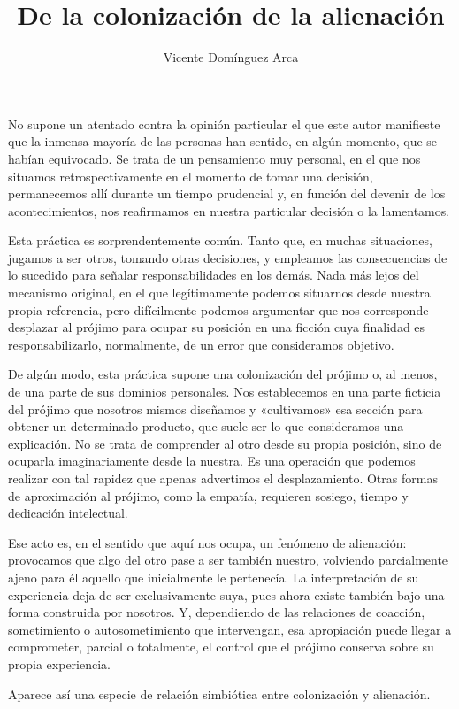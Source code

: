 \documentclass[12pt,a4paper]{article}
\title{\textbf{De la colonización de la alienación}}
\author{Vicente Domínguez Arca}
\date{}
\begin{document}
\maketitle

No supone un atentado contra la opinión particular el que este autor manifieste que la inmensa mayoría de las personas han sentido, en algún momento, que se habían equivocado. Se trata de un pensamiento muy personal, en el que nos situamos retrospectivamente en el momento de tomar una decisión, permanecemos allí durante un tiempo prudencial y, en función del devenir de los acontecimientos, nos reafirmamos en nuestra particular decisión o la lamentamos.

Esta práctica es sorprendentemente común. Tanto que, en muchas situaciones, jugamos a ser otros, tomando otras decisiones, y empleamos las consecuencias de lo sucedido para señalar responsabilidades en los demás. Nada más lejos del mecanismo original, en el que legítimamente podemos situarnos desde nuestra propia referencia, pero difícilmente podemos argumentar que nos corresponde desplazar al prójimo para ocupar su posición en una ficción cuya finalidad es responsabilizarlo, normalmente, de un error que consideramos objetivo.

De algún modo, esta práctica supone una colonización del prójimo o, al menos, de una parte de sus dominios personales. Nos establecemos en una parte ficticia del prójimo que nosotros mismos diseñamos y «cultivamos» esa sección para obtener un determinado producto, que suele ser lo que consideramos una explicación. No se trata de comprender al otro desde su propia posición, sino de ocuparla imaginariamente desde la nuestra. Es una operación que podemos realizar con tal rapidez que apenas advertimos el desplazamiento. Otras formas de aproximación al prójimo, como la empatía, requieren sosiego, tiempo y dedicación intelectual.

Ese acto es, en el sentido que aquí nos ocupa, un fenómeno de alienación: provocamos que algo del otro pase a ser también nuestro, volviendo parcialmente ajeno para él aquello que inicialmente le pertenecía. La interpretación de su experiencia deja de ser exclusivamente suya, pues ahora existe también bajo una forma construida por nosotros. Y, dependiendo de las relaciones de coacción, sometimiento o autosometimiento que intervengan, esa apropiación puede llegar a comprometer, parcial o totalmente, el control que el prójimo conserva sobre su propia experiencia.

Aparece así una especie de relación simbiótica entre colonización y alienación.
\end{document}
